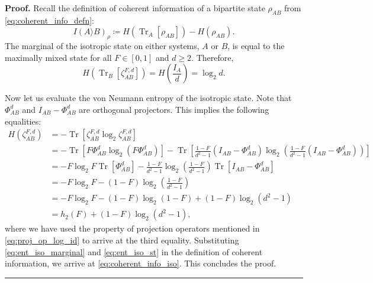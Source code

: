 \documentclass[twocolumn,letterpaper, dvipsnames,allowtoday, accepted = 2025-12-31]{quantumarticle}
\newenvironment{proof}[1][Proof]{\noindent\textbf{#1.} }{\ \rule{0.5em}{0.5em}}
\begin{document}
\begin{proof}
    Recall the definition of coherent information of a bipartite state $\rho_{AB}$ from \eqref{eq:coherent_info_defn}:
    \begin{equation}\label{eq:coherent_info_defn_iso}
		  I\!\left(A\rangle B\right)_{\rho} \coloneqq H\!\left(\operatorname{Tr}_A\!\left[\rho_{AB}\right]\right) - H\!\left(\rho_{AB}\right).
	   \end{equation}
    The marginal of the isotropic state on either systems, $A$ or $B$, is equal to the maximally mixed state for all $F\in [0,1]$ and $d\ge 2$. Therefore,
    \begin{equation}\label{eq:ent_iso_marginal}
        H\!\left(\operatorname{Tr}_B\!\left[\zeta^{F,d}_{AB}\right]\right) = H\!\left(\frac{I_{A}}{d}\right) = \log_2 d.
    \end{equation}

    Now let us evaluate the von Neumann entropy of the isotropic state. Note that $\Phi^d_{AB}$ and $I_{AB}-\Phi^d_{AB}$ are orthogonal projectors. This implies the following equalities:
    \begin{align}
        H\!\left(\zeta^{F,d}_{AB}\right)
        &= -\operatorname{Tr}\!\left[\zeta^{F,d}_{AB}\log_2\zeta^{F,d}_{AB}\right]\\
        &= -\operatorname{Tr}\!\left[F\Phi^d_{AB}\log_2\!\left(F\Phi^d_{AB}\right)\right]- \operatorname{Tr}\!\left[\frac{1-F}{d^2-1}\left(I_{AB}-\Phi^d_{AB}\right)\log_2\!\left(\frac{1-F}{d^2-1}\left(I_{AB}-\Phi^d_{AB}\right)\right)\right]\\
        &= -F\log_2F\operatorname{Tr}\!\left[\Phi^d_{AB}\right] - \frac{1-F}{d^2-1}\log_2\!\left(\frac{1-F}{d^2-1}\right)\operatorname{Tr}\!\left[I_{AB}-\Phi^d_{AB}\right]\\
        &= -F\log_2 F - (1-F)\log_2\!\left(\frac{1-F}{d^2-1}\right)\\
        &= -F\log_2 F - (1-F)\log_2(1-F) + (1-F)\log_2\!\left(d^2-1\right)\\
        & = h_2(F) + (1-F)\log_2\!\left(d^2-1\right), \label{eq:ent_iso_st}
    \end{align}
    where we have used the property of projection operators mentioned in \eqref{eq:proj_op_log_id} to arrive at the third equality. Substituting \eqref{eq:ent_iso_marginal} and \eqref{eq:ent_iso_st} in the definition of coherent information, we arrive at \eqref{eq:coherent_info_iso}. This concludes the proof.
\end{proof}
	
\end{document}
